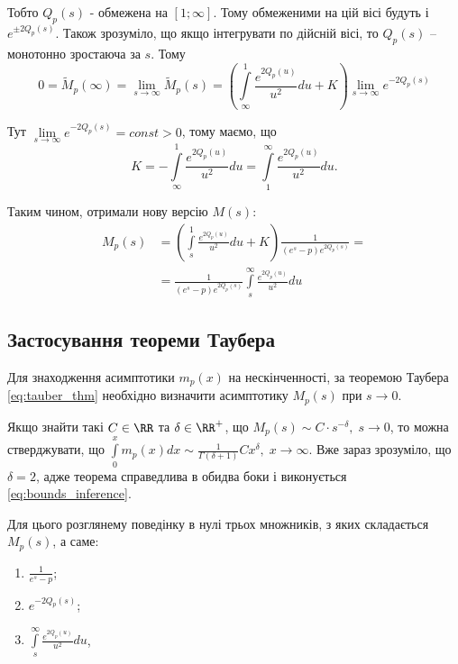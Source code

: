 Тобто $Q_p(s)$ - обмежена на $[1; \infty]$. Тому обмеженими на цій вісі будуть і $e^{\pm 2Q_p(s)}$. Також зрозуміло, що якщо інтегрувати по дійсній вісі, то $Q_p(s)$ – монотонно зростаюча за $s$. Тому
\begin{equation}
0 = \tilde M_p(\infty) = \lim_{s\rightarrow \infty} \tilde M_p(s) = \left( \int\limits_\infty^1 \frac{e^{2Q_p(u)}}{u^2} du + K \right) \lim_{s\rightarrow \infty} e^{- 2Q_p(s)}
\end{equation}

Тут $\lim\limits_{s\rightarrow \infty} e^{- 2Q_p(s)} = const > 0$, тому маємо, що
\begin{equation}
K = -  \int\limits_\infty^1 \frac{e^{2Q_p(u)}}{u^2} du =  \int\limits_1^\infty \frac{e^{2Q_p(u)}}{u^2} du.
\end{equation}

Таким чином, отримали нову версію $M(s)$:
\begin{equation}
\begin{split}
\label{eq:model_laplace_sol}
M_p(s)&= \left( \int\limits_s^1 \frac{e^{2Q_p(u)}}{u^2} du + K \right) \frac{1}{(e^s - p)  e^{2Q_p(s)}}
= \\
&=\frac{1}{(e^s - p)  e^{2Q_p(s)}} \int\limits_s^\infty \frac{e^{2Q_p(u)}}{u^2} du
\end{split}
\end{equation}

\subsection{Застосування теореми Таубера}

Для знаходження асимптотики $m_p(x)$ на нескінченності, за теоремою Таубера \eqref{eq:tauber_thm} необхідно визначити асимптотику $M_p(s)$ при $s \rightarrow 0$.

Якщо знайти такі $C \in \RR$ та $\delta \in \RR^+$, що $M_p(s) \sim C \cdot s^{-\delta}, \; s \rightarrow 0$, то можна стверджувати, що $\int\limits_0^x m_p(x) dx \sim \frac{1}{\Gamma(\delta + 1)} C x^\delta, \; x \rightarrow \infty$. Вже зараз зрозуміло, що $\delta = 2$, адже теорема справедлива в обидва боки і виконується \eqref{eq:bounds_inference}.

Для цього розглянему поведінку в нулі трьох множників, з яких складається $M_p(s)$, а саме:
\begin{enumerate}
	\item $\frac{1}{e^s - p}$;
	\item $e^{-2Q_p(s)}$;
	\item $\int\limits_s^\infty \frac{e^{2Q_p(u)}}{u^2} du$,
\end{enumerate}


